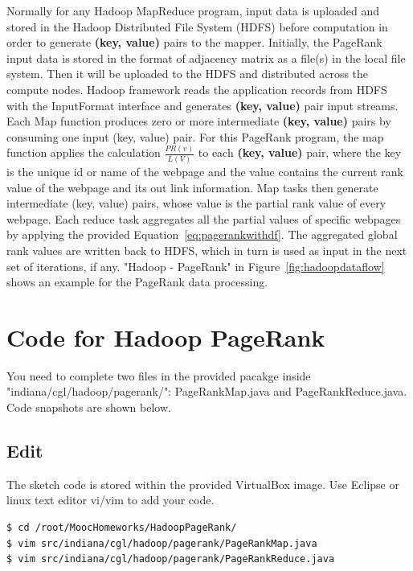 Normally for any Hadoop MapReduce program, input data is uploaded and stored in
the Hadoop Distributed File System (HDFS) before computation in order to
generate \textbf{(key, value)} pairs to the mapper. Initially, the PageRank
input data is stored in the format of adjacency matrix as a file(s) in the
local file system. Then it will be uploaded to the HDFS and distributed across
the compute nodes. Hadoop framework reads the application records from HDFS
with the InputFormat interface and generates \textbf{(key, value)} pair input
streams. Each Map function produces zero or more intermediate \textbf{(key,
value)} pairs by consuming one input (key, value) pair. For this PageRank
program, the map function applies the calculation $\frac{PR(v)}{L(V)}$ to each
\textbf{(key, value)} pair, where the key is the unique id or name of the
webpage and the value contains the current rank value of the webpage and its
out link information. Map tasks then generate intermediate (key, value) pairs,
whose value is the partial rank value of every webpage. Each reduce task
aggregates all the partial values of specific webpages by applying the provided
Equation~\ref{eq:pagerankwithdf}. The aggregated global rank values are written
back to HDFS, which in turn is used as input in the next set of iterations, if
any. "Hadoop - PageRank" in Figure~\ref{fig:hadoopdataflow} shows an example
for the PageRank data processing.


\section{Code for Hadoop PageRank}

You need to complete two files in the provided pacakge inside
"indiana/cgl/hadoop/pagerank/": PageRankMap.java and PageRankReduce.java. Code
snapshots are shown below.




\subsection{Edit}
The sketch code is stored within the provided VirtualBox image. Use Eclipse or
linux text editor vi/vim to add your code.

\begin{lstlisting}[language=bash]
$ cd /root/MoocHomeworks/HadoopPageRank/
$ vim src/indiana/cgl/hadoop/pagerank/PageRankMap.java
$ vim src/indiana/cgl/hadoop/pagerank/PageRankReduce.java
\end{lstlisting}

